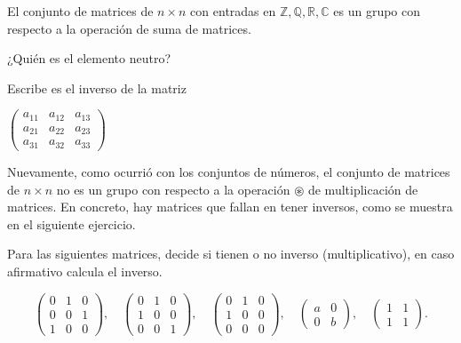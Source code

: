 \begin{ejercicio}
El conjunto de matrices de $n\times n$ con entradas en $\mathbb Z, \mathbb Q, \mathbb R, \mathbb C$ es un grupo con respecto a la operación de suma de matrices.

¿Quién es el elemento neutro?

Escribe es el inverso de la matriz 

$\left(\begin{array}{ccc}
     a_{11} & a_{12} & a_{13}\\
     a_{21} & a_{22} & a_{23}\\
     a_{31} & a_{32} & a_{33}
\end{array}\right)
$
\end{ejercicio}

Nuevamente, como ocurrió con los conjuntos de números, el conjunto de matrices de $n\times n$ no es un grupo con respecto a la operación $\circledast$ de multiplicación de matrices. En concreto, hay matrices que fallan en tener inversos, como se muestra en el siguiente ejercicio.

\begin{ejercicio}
Para las siguientes matrices, decide si tienen o no inverso (multiplicativo), en caso afirmativo calcula el inverso.

$$
\left(\begin{array}{ccc}
     0 & 1 & 0\\
     0 & 0 & 1\\
     1 & 0 & 0
\end{array}\right),
\quad
\left(\begin{array}{ccc}
     0 & 1 & 0\\
     1 & 0 & 0\\
     0 & 0 & 1
\end{array}\right),
\quad
\left(\begin{array}{ccc}
     0 & 1 & 0\\
     1 & 0 & 0\\
     0 & 0 & 0
\end{array}\right),
\quad
\left(\begin{array}{cc}
     a & 0\\
     0 & b
\end{array}\right),
\quad
\left(\begin{array}{ccc}
     1 & 1\\
     1 & 1
\end{array}\right).
$$
\end{ejercicio}


